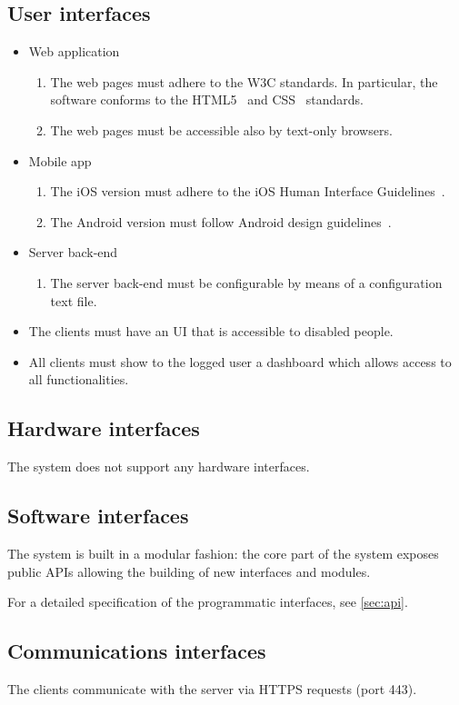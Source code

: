 \subsection{User interfaces}

\begin{itemize}
    \item Web application
        \begin{enumerate}
        \item The web pages must adhere to the W3C standards. In particular, the software conforms to the HTML5~\cite{w3c-html5} and CSS~\cite{w3c-css} standards.
        \item The web pages must be accessible also by text-only browsers.
        \end{enumerate}
    \item Mobile app
        \begin{enumerate}
        	\item The iOS version must adhere to the iOS Human Interface Guidelines~\cite{apple-ios-hig}.
	\item The Android version must follow Android design guidelines~\cite{google-android-hig}.
        \end{enumerate}
     \item Server back-end
     	\begin{enumerate}
		\item The server back-end must be configurable by means of a configuration text file.
	\end{enumerate}
	\item The clients must have an UI that is accessible to disabled people.
	\item All clients must show to the logged user a dashboard which allows access to all functionalities.
\end{itemize}

\subsection{Hardware interfaces}

The system does not support any hardware interfaces.

\subsection{Software interfaces}
The system is built in a modular fashion: the core part of the system exposes public APIs allowing the building of new interfaces and modules.

For a detailed specification of the programmatic interfaces, see \autoref{sec:api}.

\subsection{Communications interfaces}
The clients communicate with the server via HTTPS requests (port 443).
